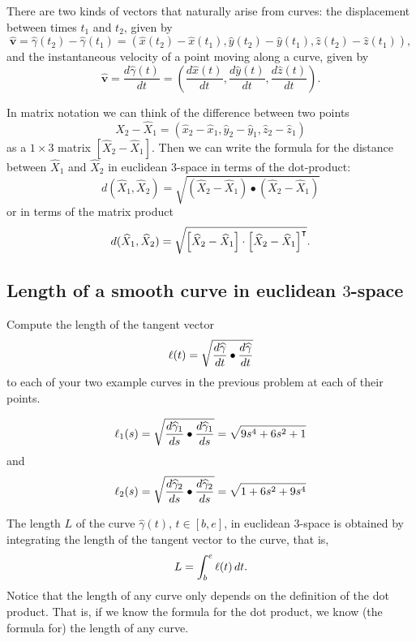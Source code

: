 \documentclass[newpage,hints,handout]{ximera}
\begin{document}
There are two kinds of vectors that naturally arise from curves: the
displacement between times $t_1$ and $t_2$, given by%
\[
\hat{\mathbf v}=\hat{\gamma}(t_2)-\hat{\gamma}(t_1)=
(\hat{x}(t_2)-\hat{x}(t_1),\hat{y}(t_2)-\hat{y}(t_1),\hat{z}(t_2)-\hat{z}(t_1)),
\]
and the instantaneous velocity of a point moving along a curve, given by%
\[
\hat{\mathbf v}=\frac{d\hat{\gamma}(t)}{dt}=
\left(\frac{d\hat{x}(t)}{dt},\frac{d\hat{y}(t)}{dt},\frac{d\hat{z}(t)}{dt}\right).
\]

In matrix notation we can think of the difference between two points
\[
\hat{X}_{2}-\hat{X}_{1}=\left(  \hat{x}_{2}-\hat{x}_{1},\hat{y}_{2}-\hat
{y}_{1},\hat{z}_{2}-\hat{z}_{1}\right)
\]
as a $1\times3$ matrix $\left[\hat{X}_{2}-\hat{X}_{1}\right]$. Then we can
write the formula for the distance between $\hat{X}_{1}$ and
$\hat{X}_{2}$ in euclidean $3$-space in terms of the dot-product:%
\begin{equation}
  d(\hat{X}_{1},\hat{X}_{2})=\sqrt{(\hat{X}_{2}-\hat{X}_{1})\bullet
    (\hat{X}_{2}-\hat{X}_{1})} \label{13}%
\end{equation}
or in terms of the matrix product%
\[
d(\widehat{X}_{1},\widehat{X}_{2}) =\sqrt{\left[\widehat{X}_{2}-\widehat{X}_{1} \right]
  \cdot\left[\widehat{X}_{2}-\widehat{X}_{1}\right]^\intercal }.
\]


\subsection{Length of a smooth curve in euclidean $3$-space}

\begin{problem}
Compute the length of the tangent vector
\[
\l(t)=\sqrt{\frac{d\hat{\gamma}}{dt}\bullet\frac{d\hat{\gamma}}{dt}}%
\]
to each of your two example curves in the previous problem at each of
their points.



\begin{freeResponse}
\[
\ell_{1}(s) = \sqrt{\frac{d\widehat{\gamma}_{1}}{ds}\bullet\frac{d\widehat{\gamma}_{1}}{ds}} = \sqrt{9s^4 + 6s^2 +1}
\] and
\[ 
\ell_{2}(s) = \sqrt{\frac{d\widehat{\gamma}_{2}}{ds}\bullet\frac{d\widehat{\gamma}_{2}}{ds}} = \sqrt{1 + 6s^2 +9s^4}
\]
\end{freeResponse}

\end{problem}

\begin{definition}
The length $L$ of the curve $\hat{\gamma}(t)$, $t\in[b,e] $, in euclidean
$3$-space is obtained by integrating the length of the tangent vector
to the curve, that is,%
\[
L=\int_{b}^{e} \ell(t)  \,dt.
\]
Notice that the length of any curve only depends on the definition of the dot
product. That is, if we know the formula for the dot product, we know (the
formula for) the length of any curve.
\end{definition}
\end{document}
